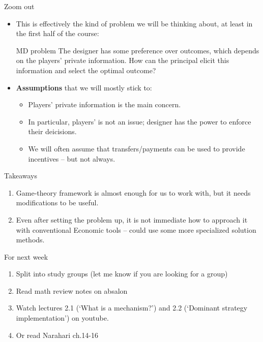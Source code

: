 \documentclass[english,10pt
,aspectratio=169
]{beamer}
\begin{document}
\begin{frame}{Zoom out}
	\begin{itemize}
		\item This is effectively the kind of problem we will be thinking about, at least in the first half of the course:
		\begin{exampleblock}{MD problem}
			The designer has some preference over outcomes, which depends on the players' private information. How can the principal elicit this information and select the optimal outcome? 
		\end{exampleblock}
		
		\item \textbf{Assumptions} that we will mostly stick to:
		\begin{itemize}
			\item Players' \alert{private information} is the main concern.
			\item In particular, players'  is not an issue; designer has the power to enforce their deicisions.
			\item We will often assume that transfers/payments can be used to provide incentives -- but not always.
		\end{itemize}
	\end{itemize}
\end{frame}


\begin{frame}{Takeaways}
	\begin{enumerate}
		\item Game-theory framework is almost enough for us to work with, but it needs modifications to be useful.
		
		\item Even after setting the problem up, it is not immediate how to approach it with conventional Economic tools -- could use some more specialized solution methods.
	\end{enumerate}
\end{frame}



\begin{frame}{For next week}
	\begin{enumerate}
		\item Split into study groups (let me know if you are looking for a group)
		\item Read math review notes on absalon
		\item Watch lectures 2.1 (`What is a mechanism?') and 2.2 (`Dominant strategy implementation') on youtube.
		\item Or read Narahari ch.14-16
	\end{enumerate}
\end{frame}
\end{document}
